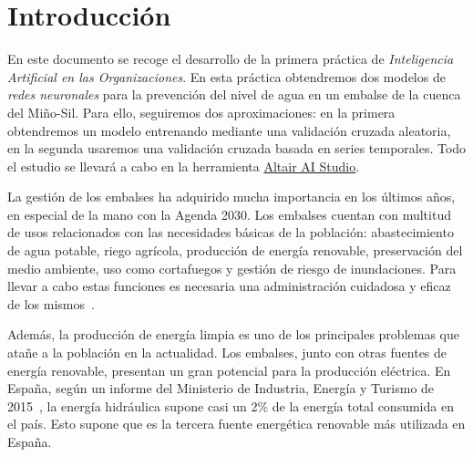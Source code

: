 \documentclass[12pt]{report} %
\begin{document}
\newpage %
\thispagestyle{empty}
\mbox{}


\tableofcontents
\thispagestyle{fancy}

\newpage %
\thispagestyle{empty}
\mbox{}

%

%


\clearpage
{} %

\chapter{Introducción}
\label{chap:intro}

En este documento se recoge el desarrollo de la primera práctica de \textit{Inteligencia Artificial en las Organizaciones}. En esta práctica obtendremos dos modelos de \textit{redes neuronales} para la prevención del nivel de agua en un embalse de la cuenca del Miño-Sil. Para ello, seguiremos dos aproximaciones: en la primera obtendremos un modelo entrenando mediante una validación cruzada aleatoria, en la segunda usaremos una validación cruzada basada en series temporales. Todo el estudio se llevará a cabo en la herramienta \href{https://altair.com/altair-ai-studio}{Altair AI Studio}.

La gestión de los embalses ha adquirido mucha importancia en los últimos años, en especial de la mano con la Agenda 2030. Los embalses cuentan con multitud de usos relacionados con las necesidades básicas de la población: abastecimiento de agua potable, riego agrícola, producción de energía renovable, preservación del medio ambiente, uso como cortafuegos y gestión de riesgo de inundaciones. Para llevar a cabo estas funciones es necesaria una administración cuidadosa y eficaz de los mismos~\cite{endesa-beneficiosembalses}.

Además, la producción de energía limpia es uno de los principales problemas que atañe a la población en la actualidad. Los embalses, junto con otras fuentes de energía renovable, presentan un gran potencial para la producción eléctrica. En España, según un informe del Ministerio de Industria, Energía y Turismo de 2015~\cite{la-energia-en-espanna}, la energía hidráulica supone casi un 2\% de la energía total consumida en el país. Esto supone que es la tercera fuente energética renovable más utilizada en España. 
\end{document}
